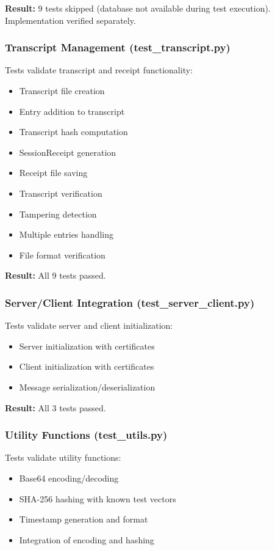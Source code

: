 \documentclass[runningheads]{llncs}
\begin{document}
\textbf{Result:} 9 tests skipped (database not available during test execution). Implementation verified separately.

\subsubsection{Transcript Management (test\_transcript.py)}

Tests validate transcript and receipt functionality:
\begin{itemize}
    \item Transcript file creation
    \item Entry addition to transcript
    \item Transcript hash computation
    \item SessionReceipt generation
    \item Receipt file saving
    \item Transcript verification
    \item Tampering detection
    \item Multiple entries handling
    \item File format verification
\end{itemize}

\textbf{Result:} All 9 tests passed.

\subsubsection{Server/Client Integration (test\_server\_client.py)}

Tests validate server and client initialization:
\begin{itemize}
    \item Server initialization with certificates
    \item Client initialization with certificates
    \item Message serialization/deserialization
\end{itemize}

\textbf{Result:} All 3 tests passed.

\subsubsection{Utility Functions (test\_utils.py)}

Tests validate utility functions:
\begin{itemize}
    \item Base64 encoding/decoding
    \item SHA-256 hashing with known test vectors
    \item Timestamp generation and format
    \item Integration of encoding and hashing
\end{itemize}
\end{document}
